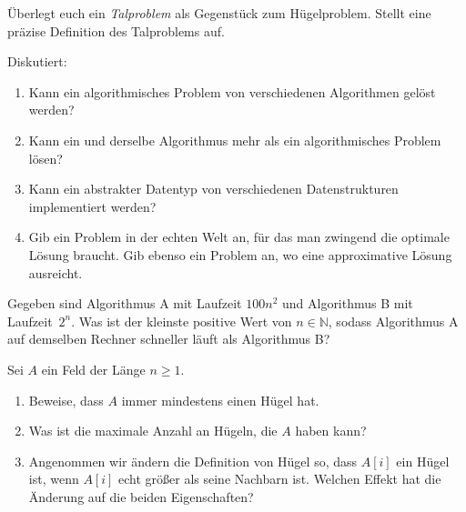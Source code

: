 \documentclass{uebung_cs}
\begin{document}
\begin{aufgabe}[Täler]
	Überlegt euch ein \emph{Talproblem} als Gegenstück zum Hügelproblem.
	Stellt eine präzise Definition des Talproblems auf.
\end{aufgabe}

\begin{aufgabe} Diskutiert:
	\begin{enumerate}
		\item Kann ein algorithmisches Problem von verschiedenen Algorithmen gelöst werden?
		\item Kann ein und derselbe Algorithmus mehr als ein algorithmisches Problem lösen?
		\item Kann ein abstrakter Datentyp von verschiedenen Datenstrukturen implementiert werden?
		\item Gib ein Problem in der echten Welt an, für das man zwingend die optimale Lösung braucht. Gib ebenso ein Problem an, wo eine approximative Lösung ausreicht.
	\end{enumerate}	
\end{aufgabe}

\begin{aufgabe}
	Gegeben sind Algorithmus A mit Laufzeit $100n^2$ und Algorithmus B mit Laufzeit~$2^n$.
	Was ist der kleinste positive Wert von $n\in\mathbb{N}$, sodass Algorithmus A auf demselben Rechner schneller läuft als Algorithmus B?
\end{aufgabe}

\begin{aufgabe}[Hügeleigenschaften]
	Sei $A$ ein Feld der Länge $n\ge 1$.
	\begin{enumerate}
		\item Beweise, dass $A$ immer mindestens einen Hügel hat.
		\item Was ist die maximale Anzahl an Hügeln, die $A$ haben kann?
		\item Angenommen wir ändern die Definition von Hügel so, dass $A[i]$ ein Hügel ist, wenn $A[i]$ echt größer als seine Nachbarn ist. Welchen Effekt hat die Änderung auf die beiden Eigenschaften?
	\end{enumerate}
\end{aufgabe}
\end{document}
